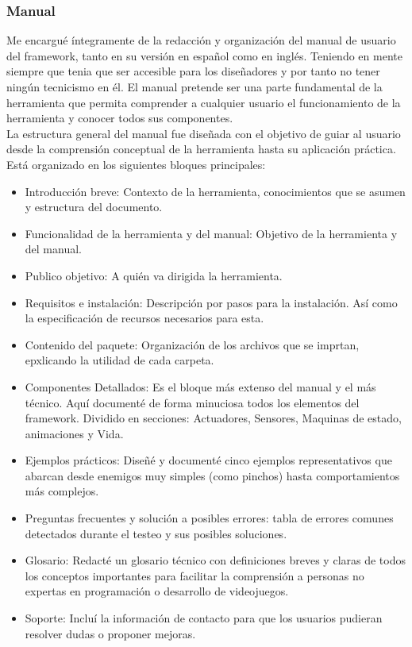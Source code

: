 \subsubsection*{Manual}
Me encargué íntegramente de la redacción y organización del manual de usuario del framework, tanto en su versión en español como en inglés. Teniendo en mente siempre que tenia que ser accesible para los diseñadores y por tanto no tener ningún tecnicismo en él. El manual pretende ser una parte fundamental de la herramienta que permita comprender a cualquier usuario el funcionamiento de la herramienta y conocer todos sus componentes. \\
La estructura general del manual fue diseñada con el objetivo de guiar al usuario desde la comprensión conceptual de la herramienta hasta su aplicación práctica. Está organizado en los siguientes bloques principales:
 \begin{itemize}
    \item Introducción breve: Contexto de la herramienta, conocimientos que se asumen y estructura del documento.
    \item Funcionalidad de la herramienta y del manual:  Objetivo de la herramienta y del manual.
    \item Publico objetivo: A quién va dirigida la herramienta.
    \item Requisitos e instalación: Descripción por pasos para la instalación. Así como la especificación de recursos necesarios  para esta.
    \item Contenido del paquete: Organización de los archivos que se imprtan, epxlicando la utilidad de cada carpeta.
    \item Componentes Detallados: Es el bloque más extenso del manual y el más técnico. Aquí documenté de forma minuciosa todos los elementos del framework. Dividido en secciones: Actuadores, Sensores, Maquinas de estado, animaciones y Vida.
    \item Ejemplos prácticos: Diseñé y documenté cinco ejemplos representativos que abarcan desde enemigos muy simples (como pinchos) hasta comportamientos más complejos.
    \item Preguntas frecuentes y solución a posibles errores: tabla de errores comunes detectados durante el testeo y sus posibles soluciones.
    \item Glosario: Redacté un glosario técnico con definiciones breves y claras de todos los conceptos importantes para facilitar la comprensión a personas no expertas en programación o desarrollo de videojuegos.
    \item Soporte: Incluí la información de contacto para que los usuarios pudieran resolver dudas o proponer mejoras.
  \end{itemize}


